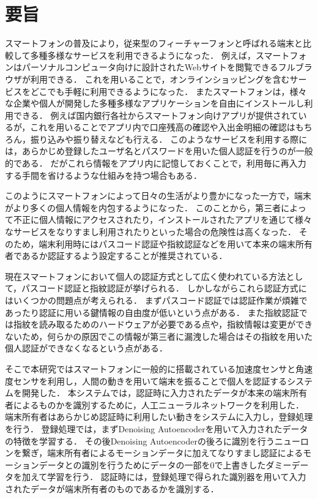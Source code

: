 \chapter*{要旨}
スマートフォンの普及により，従来型のフィーチャーフォンと呼ばれる端末と比較して多種多様なサービスを利用できるようになった．
例えば，スマートフォンはパーソナルコンピュータ向けに設計されたWebサイトを閲覧できるフルブラウザが利用できる．
これを用いることで，オンラインショッピングを含むサービスをどこでも手軽に利用できるようになった．
またスマートフォンは，様々な企業や個人が開発した多種多様なアプリケーションを自由にインストールし利用できる．
例えば国内銀行各社からスマートフォン向けアプリが提供されているが，これを用いることでアプリ内で口座残高の確認や入出金明細の確認はもちろん，振り込みや振り替えなども行える．
このようなサービスを利用する際には，あらかじめ登録したユーザ名とパスワードを用いた個人認証を行うのが一般的である．
だがこれら情報をアプリ内に記憶しておくことで，利用毎に再入力する手間を省けるような仕組みを持つ場合もある．

このようにスマートフォンによって日々の生活がより豊かになった一方で，端末がより多くの個人情報を内包するようになった．
このことから，第三者によって不正に個人情報にアクセスされたり，インストールされたアプリを通じて様々なサービスをなりすまし利用されたりといった場合の危険性は高くなった．
そのため，端末利用時にはパスコード認証や指紋認証などを用いて本来の端末所有者であるか認証するよう設定することが推奨されている．

現在スマートフォンにおいて個人の認証方式として広く使われている方法として，パスコード認証と指紋認証が挙げられる．
しかしながらこれら認証方式にはいくつかの問題点が考えられる．
まずパスコード認証では認証作業が煩雑であったり認証に用いる鍵情報の自由度が低いという点がある．
また指紋認証では指紋を読み取るためのハードウェアが必要である点や，指紋情報は変更ができないため，何らかの原因でこの情報が第三者に漏洩した場合はその指紋を用いた個人認証ができなくなるという点がある．

そこで本研究ではスマートフォンに一般的に搭載されている加速度センサと角速度センサを利用し，人間の動きを用いて端末を振ることで個人を認証するシステムを開発した．
本システムでは，認証時に入力されたデータが本来の端末所有者によるものかを識別するために，人工ニューラルネットワークを利用した．
端末所有者はあらかじめ認証時に利用したい動きをシステムに入力し，登録処理を行う．
登録処理では，まずDenoising Autoencoderを用いて入力されたデータの特徴を学習する．
その後Denoising Autoencoderの後ろに識別を行うニューロンを繋ぎ，端末所有者によるモーションデータに加えてなりすまし認証によるモーションデータとの識別を行うためにデータの一部を0で上書きしたダミーデータを加えて学習を行う．
認証時には，登録処理で得られた識別器を用いて入力されたデータが端末所有者のものであるかを識別する．


